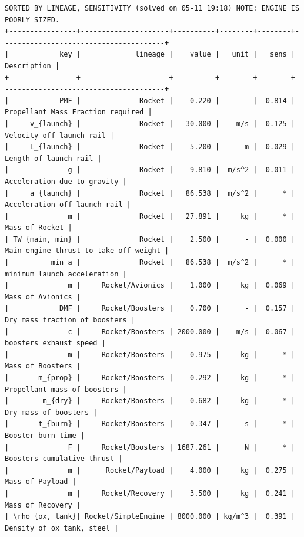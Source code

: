 \documentclass[12pt]{article}
\begin{document}
\begin{landscape}

\begin{verbatim}
SORTED BY LINEAGE, SENSITIVITY (solved on 05-11 19:18) NOTE: ENGINE IS POORLY SIZED.
+----------------+---------------------+----------+--------+--------+---------------------------------------+
|            key |             lineage |    value |   unit |   sens |                           Description |
+----------------+---------------------+----------+--------+--------+---------------------------------------+
|            PMF |              Rocket |    0.220 |      - |  0.814 |     Propellant Mass Fraction required |
|     v_{launch} |              Rocket |   30.000 |    m/s |  0.125 |              Velocity off launch rail |
|     L_{launch} |              Rocket |    5.200 |      m | -0.029 |                 Length of launch rail |
|              g |              Rocket |    9.810 |  m/s^2 |  0.011 |           Acceleration due to gravity |
|     a_{launch} |              Rocket |   86.538 |  m/s^2 |      * |          Acceleration off launch rail |
|              m |              Rocket |   27.891 |     kg |      * |                        Mass of Rocket |
| TW_{main, min} |              Rocket |    2.500 |      - |  0.000 | Main engine thrust to take off weight |
|          min_a |              Rocket |   86.538 |  m/s^2 |      * |           minimum launch acceleration |
|              m |     Rocket/Avionics |    1.000 |     kg |  0.069 |                      Mass of Avionics |
|            DMF |     Rocket/Boosters |    0.700 |      - |  0.157 |         Dry mass fraction of boosters |
|              c |     Rocket/Boosters | 2000.000 |    m/s | -0.067 |                boosters exhaust speed |
|              m |     Rocket/Boosters |    0.975 |     kg |      * |                      Mass of Boosters |
|       m_{prop} |     Rocket/Boosters |    0.292 |     kg |      * |           Propellant mass of boosters |
|        m_{dry} |     Rocket/Boosters |    0.682 |     kg |      * |                  Dry mass of boosters |
|       t_{burn} |     Rocket/Boosters |    0.347 |      s |      * |                     Booster burn time |
|              F |     Rocket/Boosters | 1687.261 |      N |      * |            Boosters cumulative thrust |
|              m |      Rocket/Payload |    4.000 |     kg |  0.275 |                       Mass of Payload |
|              m |     Rocket/Recovery |    3.500 |     kg |  0.241 |                      Mass of Recovery |
| \rho_{ox, tank}| Rocket/SimpleEngine | 8000.000 | kg/m^3 |  0.391 |             Density of ox tank, steel |

\end{verbatim}
\end{landscape}
\end{document}
